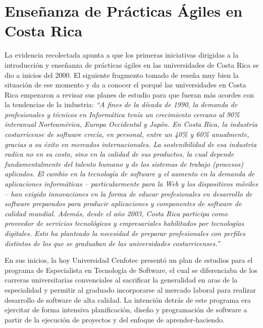\documentclass[journal]{IEEEtran}
\begin{document}
\section{Enseñanza de Prácticas Ágiles en Costa Rica} \label{sec:costa-rica}
La evidencia recolectada apunta a que los primeras iniciativas dirigidas a la introducción y enseñanza de prácticas ágiles en las universidades de Costa Rica se dio a inicios del 2000. El siguiente fragmento tomado de \cite{cenfotec-2} reseña muy bien la situación de ese momento y da a conocer el porqué las universidades en Costa Rica empezaron a revisar sus planes de estudio para que fueran más acordes con la tendencias de la industria: \emph{``A fines de la década de 1990, la demanda de profesionales y técnicos en Informática tenía un crecimiento cercano al 90\% interanual Norteamérica, Europa Occidental y Japón. En Costa Rica, la industria costarricense de software crecía, en personal, entre un 40\% y 60\% anualmente, gracias a su éxito en mercados internacionales. La sostenibilidad de esa industria radica no en su costo, sino en la calidad de sus productos, la cual depende fundamentalmente del talento humano y de los sistemas de trabajo (procesos) aplicados. El cambio en la tecnología de software y el aumento en la demanda de aplicaciones informáticas – particularmente para la Web y los dispositivos móviles – han exigido innovaciones en la forma de educar profesionales en desarrollo de software preparados para producir aplicaciones y componentes de software de calidad mundial. Además, desde el año 2003, Costa Rica participa como proveedor de servicios tecnológicos y empresariales habilitados por tecnologías digitales. Esto ha planteado la necesidad de preparar profesionales con perfiles distintos de los que se graduaban de las universidades costarricenses.''}

En sus inicios, la hoy Universidad Cenfotec \cite{cenfotec-1} presentó un plan de estudios para el programa de Especialista en Tecnología de Software, el cual se diferenciaba de los carreras universitarias convenciales al sacrificar la generalidad en aras de la especialidad y permitir al graduado incorporarse al mercado laboral para realizar desarrollo de software de alta calidad. La intención detrás de este programa era ejercitar de forma intensiva planificación, diseño y programación de software a partir de la ejecución de proyectos y del enfoque de aprender-haciendo.
\end{document}

